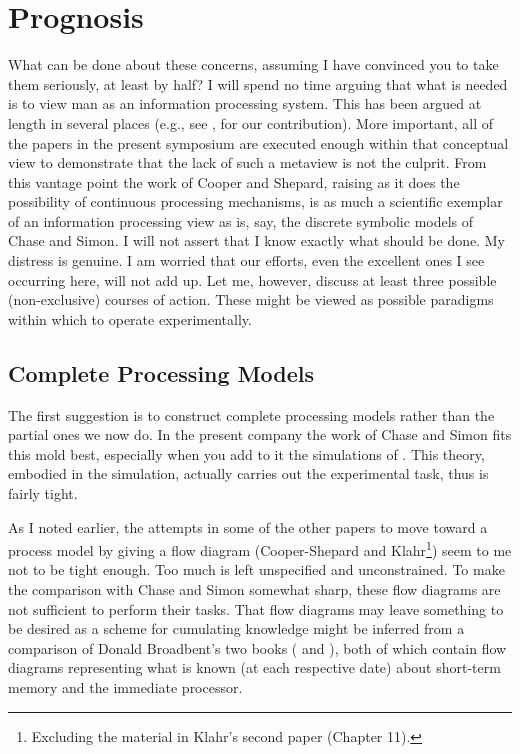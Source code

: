 \documentclass{paper}
\newcounter{oldpagecounter}
\newcommand\oldpage{\stepcounter{oldpagecounter}\marginpar{\footnotesize{\textcolor{mygrey}{pg. \arabic{oldpagecounter}}}}}
\begin{document}
\section*{Prognosis}
What can be done about these concerns, assuming I have convinced you to take them seriously, at least by half? I will spend no time arguing that what is needed is to view man as an information processing system. This has been argued at length in several places (e.g., see \citet{NewellSimon1972}, for our contribution). More important, all of the papers in the present symposium are executed enough within that conceptual view to demonstrate that the lack of such a metaview is not the culprit. From this vantage point the work of Cooper and Shepard, raising as it does the possibility of continuous processing mechanisms, is as much a scientific exemplar of an information processing view as is, say, the discrete symbolic models of Chase and Simon. I will not assert that I know exactly what should be done. My distress is genuine. I am worried that our efforts, even the excellent ones I see occurring here, will not add up. Let me, however, discuss at least three possible (non-exclusive) courses of action. These might be viewed as possible paradigms within which to operate experimentally.

\subsection*{Complete Processing Models}
The first suggestion is to construct complete processing models rather than the partial ones we now do. In the present company the work of Chase and Simon fits this mold best, especially when you add to it the simulations of \cite{SimonGilmartin1973}. This theory, embodied in the simulation, actually carries out the experimental task, thus is fairly tight. \oldpage

As I noted earlier, the attempts in some of the other papers to move toward a process model by giving a flow diagram (Cooper-Shepard and Klahr\footnote{Excluding the material in Klahr's second paper
(Chapter 11).}) seem to me not to be tight enough. Too much is left unspecified and unconstrained. To make the comparison with Chase and Simon somewhat sharp, these flow diagrams are not sufficient to perform their tasks. That flow diagrams may leave something to be desired as a scheme for cumulating knowledge might be inferred from a comparison of Donald Broadbent's two books (\citeyear{Broadbent1958} and \citeyear{Broadbent1971}), both of which contain flow diagrams representing what is known (at each respective date) about short-term memory and the immediate processor. 
\end{document}
